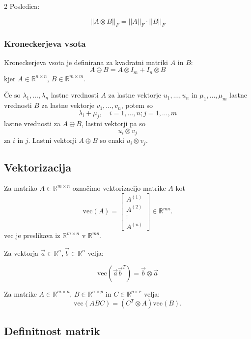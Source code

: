 \documentclass{article}
\begin{document}
\begin{multicols}{2}
	Posledica:

	\[
		||A \otimes B||_F = ||A||_F \cdot ||B||_F
	\]

	\subsubsection{Kroneckerjeva vsota}

	Kroneckerjeva vsota je definirana za kvadratni matriki \( A \) in \( B \):
	\[ A \oplus B = A \otimes I_m + I_n \otimes B \]
	kjer \( A \in \mathbb{R}^{n \times n} \), \( B \in \mathbb{R}^{m \times m} \).

	\(\text{Če so } \lambda_1, \ldots, \lambda_n \) lastne vrednosti \( A \) za lastne vektorje \( u_1, \ldots, u_n \) in \( \mu_1, \ldots, \mu_m \) lastne vrednosti \( B \) za lastne vektorje \( v_1, \ldots, v_n \), potem so
	\[ \lambda_i + \mu_j, \quad i = 1, \ldots, n; j = 1, \ldots, m \]
	lastne vrednosti za \( A \oplus B \), lastni vektorji pa so
	\[ u_i \otimes v_j \]
	za \( i \) in \( j \). Lastni vektorji \( A \oplus B \) so enaki \( u_i \otimes v_j \).


	\subsection{Vektorizacija}

	Za matriko \( A \in \mathbb{R}^{m \times n} \) označimo vektorizacijo matrike \( A \) kot
	\[
		\text{vec}(A) = \begin{bmatrix}
			A^{(1)} \\
			A^{(2)} \\
			\vdots  \\
			A^{(n)}
		\end{bmatrix} \in \mathbb{R}^{mn}.
	\]
	vec je preslikava iz \( \mathbb{R}^{m \times n} \) v \( \mathbb{R}^{mn} \).

	Za vektorja $\vec{a} \in \mathbb{R}^{n}, \vec{b} \in \mathbb{R}^{n} $ velja:

	\[
		\text{vec}(\vec{a} \vec{b}^{T}) =  \vec{b} \otimes \vec{a}
	\]

	Za matrike \( A \in \mathbb{R}^{m \times n} \), \( B \in \mathbb{R}^{n \times p} \) in \( C \in \mathbb{R}^{p \times r} \) velja:
	\[
		\text{vec}(ABC) = (C^T \otimes A)\text{vec}(B).
	\]

	\subsection{Definitnost matrik}


\end{multicols}
\end{document}
